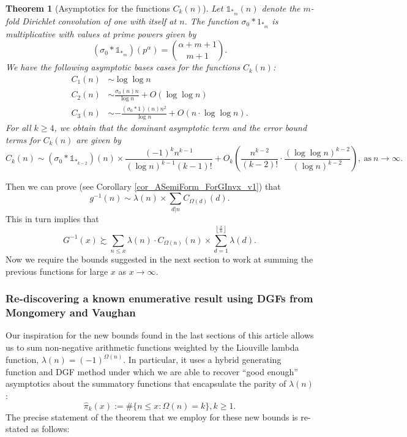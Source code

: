 \documentclass[11pt,reqno,a4letter]{article}
\numberwithin{figure}{section}
\numberwithin{table}{section}
\newcommand{\Floor}[2]{\ensuremath{\left\lfloor \frac{#1}{#2} \right\rfloor}}
\theoremstyle{plain}
\newtheorem{theorem}{Theorem}
\numberwithin{theorem}{section}
\theoremstyle{definition}
\begin{document}
\begin{theorem}[Asymptotics for the functions $C_k(n)$] 
\label{theorem_Ckn_GeneralAsymptoticsForms} 
Let $\mathds{1}_{\ast_m}(n)$ denote the $m$-fold Dirichlet convolution of one with itself at $n$. 
The function $\sigma_0 \ast 1_{\ast_m}$ is multiplicative with values at prime powers 
given by 
\[
(\sigma_0 \ast \mathds{1}_{\ast_m})(p^{\alpha}) = \binom{\alpha+m+1}{m+1}. 
\]
We have the following asymptotic bases cases for the functions $C_k(n)$: 
\begin{align*} 
C_1(n) & \sim \log\log n \\ 
C_2(n) & \sim \frac{\sigma_0(n) n}{\log n} + O(\log\log n) \\ 
C_3(n) & \sim -\frac{(\sigma_0 \ast 1)(n) n^2}{\log n} + 
     O\left(n \cdot \log\log n\right). 
\end{align*} 
For all $k \geq 4$, we obtain that the dominant asymptotic term and the error bound terms for 
$C_k(n)$ are given by 
\[
C_k(n) \sim (\sigma_0 \ast \mathds{1}_{\ast_{k-2}})(n) \times \frac{(-1)^{k} n^{k-1}}{(\log n)^{k-1} (k-1)!} + 
     O_k\left(\frac{n^{k-2}}{(k-2)!} \cdot \frac{(\log\log n)^{k-2}}{(\log n)^{k-2}}\right), 
     \mathrm{\ as\ }n \rightarrow \infty. 
\]
\end{theorem} 

Then we can prove (see Corollary \ref{cor_ASemiForm_ForGInvx_v1}) that 
\[
g^{-1}(n) \sim \lambda(n) \times \sum_{d|n} C_{\Omega(d)}(d). 
\]
This in turn implies that 
\[
G^{-1}(x) \succsim \sum_{n \leq x} \lambda(n) \cdot C_{\Omega(n)}(n) \times 
     \sum_{d=1}^{\Floor{x}{n}} \lambda(d). 
\]
Now we require the bounds suggested in the next section to work at summing the 
previous functions for large $x$ as $x \rightarrow \infty$. 

\subsubsection{Re-discovering a known enumerative result using DGFs from Mongomery and Vaughan} 

Our inspiration for the new bounds found in the last sections of this article allows us to sum 
non-negative arithmetic functions weighted by the Liouville lambda function, 
$\lambda(n) = (-1)^{\Omega(n)}$. In particular, it uses a hybrid generating function and DGF method 
under which we are able to recover ``good enough'' asymptotics about the summatory functions that 
encapsulate the parity of $\lambda(n)$: 
\[
\widehat{\pi}_k(x) := \#\{n \leq x: \Omega(n) = k\}, k \geq 1. 
\] 
The precise statement of the theorem that we employ for these new bounds is re-stated as follows: 
\end{document}
